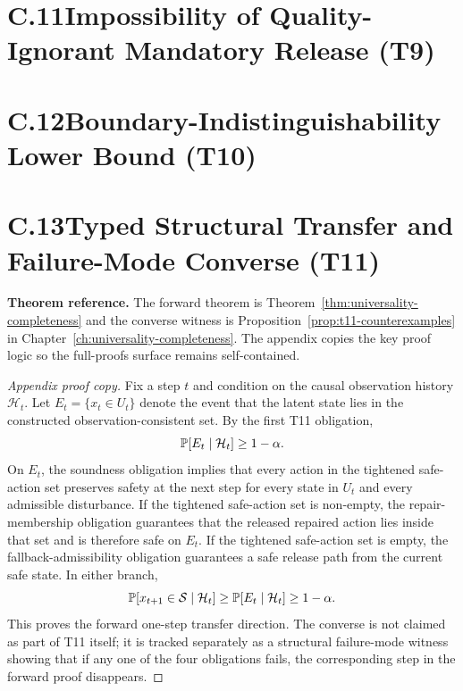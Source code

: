 \section{C.11\quad Impossibility of Quality-Ignorant Mandatory Release (T9)}
\label{sec:proof-universal-impossibility}


\section{C.12\quad Boundary-Indistinguishability Lower Bound (T10)}
\label{sec:proof-frontier-lower-bound}


\section{C.13\quad Typed Structural Transfer and Failure-Mode Converse (T11)}\label{sec:proof-typed-transfer}
\textbf{Theorem reference.}
The forward theorem is Theorem~\ref{thm:universality-completeness} and the
converse witness is Proposition~\ref{prop:t11-counterexamples} in
Chapter~\ref{ch:universality-completeness}.  The appendix copies the key proof
logic so the full-proofs surface remains self-contained.

\begin{proof}[Appendix proof copy]
Fix a step $t$ and condition on the causal observation history
$\mathcal{H}_t$.  Let $E_t = \{x_t \in U_t\}$ denote the event that the latent
state lies in the constructed observation-consistent set.  By the first T11
obligation,
\[
  \operatorname{\mathbb{P}}[E_t \mid \mathcal{H}_t] \ge 1-\alpha.
\]
On $E_t$, the soundness obligation implies that every action in the tightened
safe-action set preserves safety at the next step for every state in $U_t$ and
every admissible disturbance.  If the tightened safe-action set is non-empty,
the repair-membership obligation guarantees that the released repaired action
lies inside that set and is therefore safe on $E_t$.  If the tightened
safe-action set is empty, the fallback-admissibility obligation guarantees a
safe release path from the current safe state.  In either branch,
\[
  \operatorname{\mathbb{P}}[x_{t+1}\in\mathcal{S}\mid\mathcal{H}_t]
  \ge
  \operatorname{\mathbb{P}}[E_t\mid\mathcal{H}_t]
  \ge
  1-\alpha.
\]
This proves the forward one-step transfer direction.  The converse is not
claimed as part of T11 itself; it is tracked separately as a structural
failure-mode witness showing that if any one of the four obligations fails,
the corresponding step in the forward proof disappears.
\end{proof}

